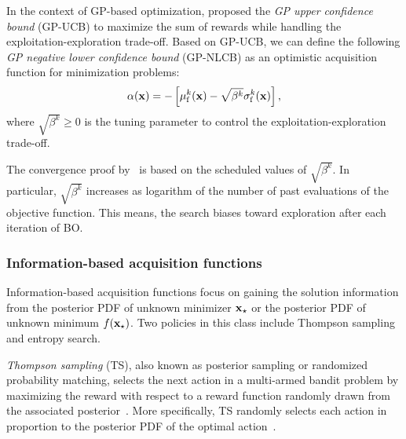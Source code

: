 \documentclass[iicol,sn-basic]{sn-jnl}%
\begin{document}
In the context of GP-based optimization, \cite{Srinivas2010} proposed the \textit{GP upper confidence bound} (GP-UCB) to maximize the sum of rewards while handling the exploitation-exploration trade-off.
Based on GP-UCB, we can define the following \textit{GP negative lower confidence bound} (GP-NLCB) as an optimistic acquisition function for minimization problems:
\begin{equation}\label{Eq45}
	\alpha({\bf x}) = -\left[\mu_\text{f}^k({\bf x})-\sqrt{\beta^k} \sigma_\text{f}^k({\bf x})\right],
\end{equation}
where $\sqrt{\beta^k} \geq 0$ is the tuning parameter to control the exploitation-exploration trade-off.

The convergence proof by~\cite{Srinivas2010} is based on the scheduled values of $\sqrt{\beta^k}$.
In particular, $\sqrt{\beta^k}$ increases as logarithm of the number of past evaluations of the objective function.
This means, the search biases toward exploration after each iteration of BO.

\subsubsection{Information-based acquisition functions}\label{Sec513}

Information-based acquisition functions focus on gaining the solution information from the posterior PDF of unknown minimizer ${\bf x}_\star$ or the posterior PDF of unknown minimum $f({\bf x}_\star)$.
Two policies in this class include Thompson sampling and entropy search.

\textit{Thompson sampling} (TS), also known as posterior sampling or randomized probability matching, selects the next action in a multi-armed bandit problem by maximizing the reward with respect to a reward function randomly drawn from the associated posterior~\citep[see e.g.,][]{Chapelle2011,Agrawal2012,Bijl2016}.
More specifically, TS randomly selects each action in proportion to the posterior PDF of the optimal action~\citep{Scott2010}.
\end{document}
